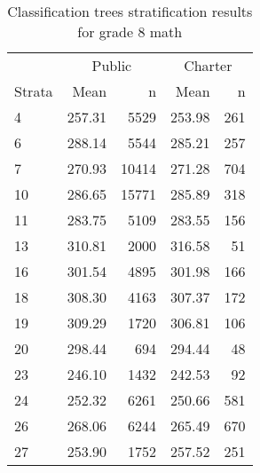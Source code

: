 \begin{table}[ht]
\centering
\caption{Classification trees stratification results for grade 8 math} 
\label{g8math-circpsa-tree}
\begin{tabular}{lrr@{\extracolsep{.2cm}}rr}
  \hline
   & \multicolumn{2}{c}{Public} & \multicolumn{2}{c}{Charter} \\ \cline{2-3} \cline{4-5} Strata & Mean & n & Mean & n \\ \hline
4 & 257.31 & 5529 & 253.98 & 261 \\ 
  6 & 288.14 & 5544 & 285.21 & 257 \\ 
  7 & 270.93 & 10414 & 271.28 & 704 \\ 
  10 & 286.65 & 15771 & 285.89 & 318 \\ 
  11 & 283.75 & 5109 & 283.55 & 156 \\ 
  13 & 310.81 & 2000 & 316.58 &  51 \\ 
  16 & 301.54 & 4895 & 301.98 & 166 \\ 
  18 & 308.30 & 4163 & 307.37 & 172 \\ 
  19 & 309.29 & 1720 & 306.81 & 106 \\ 
  20 & 298.44 & 694 & 294.44 &  48 \\ 
  23 & 246.10 & 1432 & 242.53 &  92 \\ 
  24 & 252.32 & 6261 & 250.66 & 581 \\ 
  26 & 268.06 & 6244 & 265.49 & 670 \\ 
  27 & 253.90 & 1752 & 257.52 & 251 \\ 
   \hline
\end{tabular}
\end{table}
